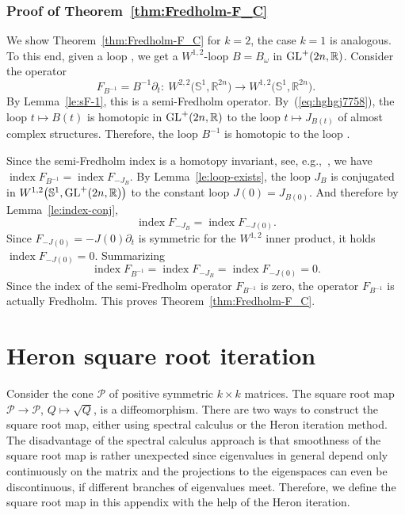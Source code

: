 \documentclass[pdftex]{sigma}
\numberwithin{equation}{section}
\newcommand{\R}{{\mathbb{R}}}
\renewcommand{\SS}{{\mathbb{S}}}
\newcommand{\Pp}{{\mathcal{P}}}
\newcommand{\INDEX}{\mathop{\mathrm{index}}} %
\newcommand{\GL}{{\rm GL}}
\newcommand{\p}{{\partial}}
\newcommand{\1}{{{\mathchoice {\rm 1\mskip-4mu l} {\rm 1\mskip-4mu l}
{\rm 1\mskip-4.5mu l} {\rm 1\mskip-5mu l}}}}
\begin{document}
\subsubsection*{Proof of Theorem~\ref{thm:Fredholm-F_C}}

We show Theorem~\ref{thm:Fredholm-F_C} for $k=2$, the case $k=1$
is analogous. To this end,
given a loop \smash{$\omega\in W^{1,2}\bigl(\SS^1,\Omega\bigl(\R^{2n}\bigr)\bigr)$},
we get a $W^{1,2}$-loop $B=B_\omega$ in $\GL^+(2n,\R)$.
Consider the operator
\[
 F_{B^{-1}}=B^{-1}\p_t\colon\ W^{2,2}\bigl(\SS^1,\R^{2n}\bigr)
 \to W^{1,2}\bigl(\SS^1,\R^{2n}\bigr) .
\]
By Lemma~\ref{le:sF-1}, this is a semi-Fredholm operator.
By~(\ref{eq:hghgj7758}), the loop $t\mapsto B(t)$ is homotopic in
$\GL^+(2n,\R)$ to the loop $t\mapsto J_{B(t)}$ of almost complex structures.
Therefore, the loop $B^{-1}$ is homotopic to the loop .

Since the semi-Fredholm index is a homotopy invariant,
see, e.g.,~\cite[Section~18, Corollary~3]{Muller:2007a},
we have
$ \INDEX F_{B^{-1}} = \INDEX F_{-J_B}$.
By Lemma~\ref{le:loop-exists}, the loop $J_B$ is conjugated in
$W^{1,2}\bigl(\SS^1,\GL^+(2n,\R)\bigr)$ to the constant loop $J(0)=J_{B(0)}$.
And therefore by Lemma~\ref{le:index-conj},
\[
 \INDEX F_{-J_B} = \INDEX F_{-J(0)}.
\]
Since $F_{-J(0)}=-J(0)\p_t$ is symmetric for the $W^{1,2}$
inner product, it holds
$
 \INDEX F_{-J(0)} =0$.
Summarizing
\[
 \INDEX F_{B^{-1}}
 =
 \INDEX F_{-J_B}
 =
 \INDEX F_{-J(0)}
 =0 .
\]
Since the index of the semi-Fredholm operator
$F_{B^{-1}}$ is zero, the operator $F_{B^{-1}}$ is actually Fredholm.
This proves Theorem~\ref{thm:Fredholm-F_C}.

\section{Heron square root iteration}

Consider the cone $\Pp$ of positive symmetric $k \times k$ matrices.
The square root map $\Pp\to\Pp$, $Q\mapsto \sqrt{Q}$,
is a diffeomorphism.
There are two ways to construct the square root map,
either using spectral calculus or the Heron iteration method.
The disadvantage of the spectral calculus approach
is that smoothness of the square root map is rather unexpected
since eigenvalues in general depend only continuously on the matrix
and the projections to the eigenspaces can even be discontinuous,
if different branches of eigenvalues meet.
Therefore, we define the square root map in this appendix with the
help of the Heron iteration.
\end{document}
